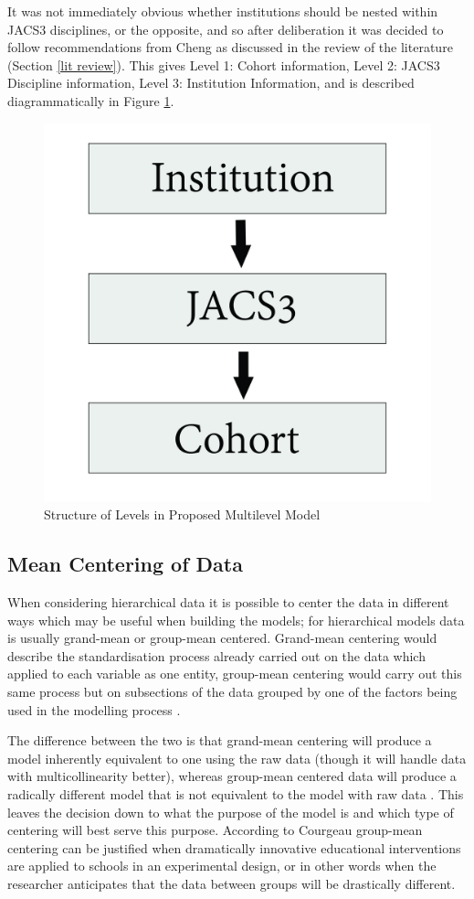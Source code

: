 \documentclass[11pt,a4paper]{report}
\begin{document}
It was not immediately obvious whether institutions should be nested within JACS3 disciplines, or the opposite, and so after deliberation it was decided to follow recommendations from Cheng \cite{cheng2010unicoursediffs} as discussed in the review of the literature (Section \ref{lit review}). This gives Level 1: Cohort information, Level 2: JACS3 Discipline information, Level 3: Institution Information, and is described diagrammatically in Figure \ref{fig:MLMStructure}. 

\begin{figure}
	\centering
	\includegraphics[width=0.3\linewidth]{images/MLMStructure}
	\caption{Structure of Levels in Proposed Multilevel Model}
	\label{fig:MLMStructure}
\end{figure}

\subsection{Mean Centering of Data}
When considering hierarchical data it is possible to center the data in different ways which may be useful when building the models; for hierarchical models data is usually grand-mean or group-mean centered. Grand-mean centering would describe the standardisation process already carried out on the data which applied to each variable as one entity, group-mean centering would carry out this same process but on subsections of the data grouped by one of the factors being used in the modelling process \cite{LinearMMs}. 

The difference between the two is that grand-mean centering will produce a model inherently equivalent to one using the raw data (though it will handle data with multicollinearity better), whereas group-mean centered data will produce a radically different model that is not equivalent to the model with raw data \cite{raudenbush1995estimation}. This leaves the decision down to what the purpose of the model is and which type of centering will best serve this purpose. According to Courgeau \cite{courgeau2003methodology} group-mean centering can be justified when dramatically innovative educational interventions are applied to schools in an experimental design, or in other words when the researcher anticipates that the data between groups will be drastically different. 
\end{document}
